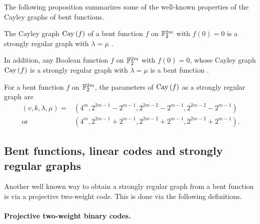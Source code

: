 
The following proposition summarizes some of the well-known properties of the Cayley graphs of bent functions.
\begin{Proposition}
\label{pr-Cayley-bent-strongly-regular}
The Cayley graph $\operatorname{Cay}\left(f\right)$ of a bent function $f$ on $\mathbb{F}_2^{2m}$
with $f(0)=0$ is a strongly regular graph with $\lambda = \mu$ \cite[Lemma 12]{BerC99}.

In addition, any Boolean function $f$ on $\mathbb{F}_2^{2m}$ with $f(0)=0$,
whose Cayley graph $\operatorname{Cay}\left(f\right)$ is a strongly regular graph with $\lambda = \mu$ is a bent function
\cite[Theorem 3]{BerCV01} \cite[Theorem 3.1]{Sta07}.

For a bent function $f$ on $\mathbb{F}_2^{2m}$,
the parameters of $\operatorname{Cay}\left(f\right)$ as a strongly regular graph
are \cite[Theorem 6.2.10]{Dil74} \cite[Theorem 3.2]{HuaY04}
\begin{align*}
(v,k,\lambda,\mu) = &(4^m, 2^{2 m - 1} - 2^{m-1}, 2^{2 m - 2} - 2^{m-1}, 2^{2 m - 2} - 2^{m-1})
\\
  \text{or} \quad &(4^m, 2^{2 m - 1} + 2^{m-1}, 2^{2 m - 2} + 2^{m-1}, 2^{2 m - 2} + 2^{m-1}).
\end{align*}
\end{Proposition}

%
\subsection{Bent functions, linear codes and strongly regular graphs}
Another well known way to obtain a strongly regular graph from a bent function is via a projective two-weight
code.
This is done via the following definitions.
\paragraph*{Projective two-weight binary codes.}

